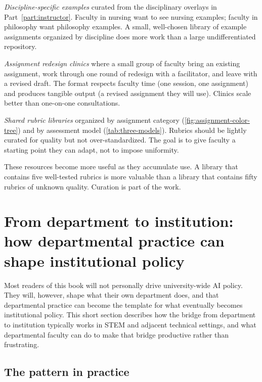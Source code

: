 \documentclass{SIAMbook2023}
\begin{document}
\textit{Discipline-specific examples} curated from the disciplinary overlays in Part~\ref{part:instructor}. Faculty in nursing want to see nursing examples; faculty in philosophy want philosophy examples. A small, well-chosen library of example assignments organized by discipline does more work than a large undifferentiated repository.

\textit{Assignment redesign clinics} where a small group of faculty bring an existing assignment, work through one round of redesign with a facilitator, and leave with a revised draft. The format respects faculty time (one session, one assignment) and produces tangible output (a revised assignment they will use). Clinics scale better than one-on-one consultations.

\textit{Shared rubric libraries} organized by assignment category (\cref{fig:assignment-color-tree}) and by assessment model (\cref{tab:three-models}). Rubrics should be lightly curated for quality but not over-standardized. The goal is to give faculty a starting point they can adapt, not to impose uniformity.

These resources become more useful as they accumulate use. A library that contains five well-tested rubrics is more valuable than a library that contains fifty rubrics of unknown quality. Curation is part of the work.

\section[From department to institution]{From department to institution: how departmental practice can shape institutional policy}
\label{u:sec:dept-to-institution}%

Most readers of this book will not personally drive university-wide AI policy. They will, however, shape what their own department does, and that departmental practice can become the template for what eventually becomes institutional policy. This short section describes how the bridge from department to institution typically works in STEM and adjacent technical settings, and what departmental faculty can do to make that bridge productive rather than frustrating.

\subsection{The pattern in practice}
\label{u:subsec:dept-to-institution-pattern}
\end{document}
